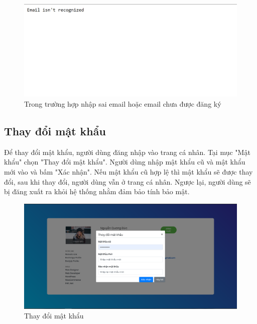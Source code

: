 \documentclass[a4paper]{article}
\begin{document}
	\begin{figure}[H]
		\centering
		\includegraphics[scale=0.8]{email_not_reconize.png}
		\caption{Trong trường hợp nhập sai email hoặc email chưa được đăng ký}
		\label{F:email_not_reconize}
	\end{figure}
	
	\subsection{Thay đổi mật khẩu}
	Để thay đổi mật khẩu, người dùng đăng nhập vào trang cá nhân. Tại mục "Mật khẩu" chọn "Thay đổi mật khẩu".\linebreak
	Người dùng nhập mật khẩu cũ và mật khẩu mới vào và bấm "Xác nhận". Nếu mật khẩu cũ hợp lệ thì mật khẩu sẽ được thay đổi, sau khi thay đổi, người dùng vẫn ở trang cá nhân. Ngược lại, người dùng sẽ bị đăng xuất ra khỏi hệ thống nhằm đảm bảo tính bảo mật.
	
	\begin{figure}[H]
		\centering
		\includegraphics[scale=0.36]{change_password.png}
		\caption{Thay đổi mật khẩu}
		\label{F:change_password}
	\end{figure}
	
\end{document}
